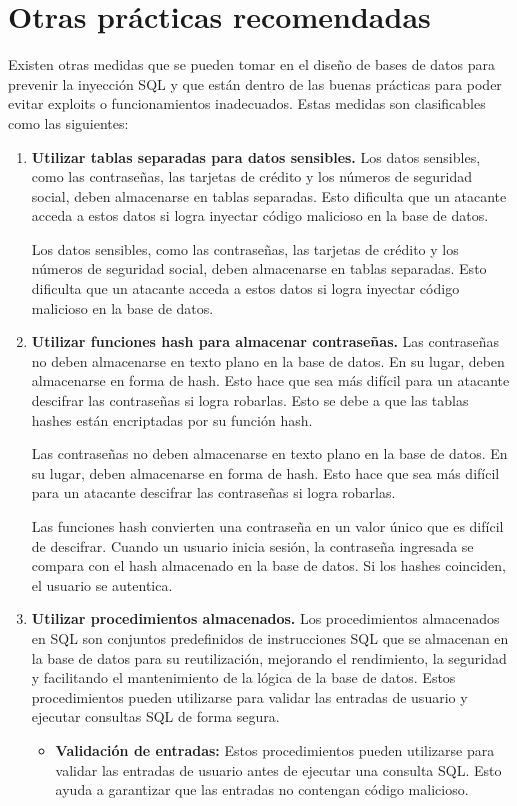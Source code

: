 \documentclass[11pt]{report}
\begin{document}
\section{Otras prácticas recomendadas}
Existen otras medidas que se pueden tomar en el diseño de bases de datos para prevenir la inyección SQL y que están dentro de las buenas prácticas para poder 
evitar exploits o funcionamientos inadecuados. Estas medidas son clasificables como las siguientes:
\begin{enumerate}
  \item \textbf{Utilizar tablas separadas para datos sensibles.} Los datos sensibles, como las contraseñas, las tarjetas
  de crédito y los números de seguridad social, deben almacenarse en tablas separadas. Esto dificulta que un atacante 
  acceda a estos datos si logra inyectar código malicioso en la base de datos.

  Los datos sensibles, como las contraseñas, las tarjetas de crédito y los números de seguridad social, deben almacenarse
  en tablas separadas. Esto dificulta que un atacante acceda a estos datos si logra inyectar código malicioso en la base
  de datos.
  
  \item \textbf{Utilizar funciones hash para almacenar contraseñas.} Las contraseñas no deben almacenarse en texto plano en
  la base de datos. En su lugar, deben almacenarse en forma de hash. Esto hace que sea más difícil para un atacante descifrar
  las contraseñas si logra robarlas. Esto se debe a que las tablas hashes están encriptadas por su función hash.

  Las contraseñas no deben almacenarse en texto plano en la base de datos. En su lugar, deben almacenarse en forma de hash.
  Esto hace que sea más difícil para un atacante descifrar las contraseñas si logra robarlas.
  
  Las funciones hash convierten una contraseña en un valor único que es difícil de descifrar. Cuando un usuario inicia sesión,
  la contraseña ingresada se compara con el hash almacenado en la base de datos. Si los hashes coinciden, el usuario se autentica.
  
  \item \textbf{Utilizar procedimientos almacenados.} Los procedimientos almacenados en SQL son conjuntos predefinidos de instrucciones 
  SQL que se almacenan en la base de datos para su reutilización, mejorando el rendimiento, la seguridad y facilitando el mantenimiento 
  de la lógica de la base de datos. Estos procedimientos pueden utilizarse para validar las entradas de usuario y ejecutar consultas SQL
  de forma segura.
  \begin{itemize}
    \item \textbf{Validación de entradas:} Estos procedimientos pueden utilizarse para validar las entradas de usuario antes de ejecutar 
    una consulta SQL. Esto ayuda a garantizar que las entradas no contengan código malicioso.
    

\end{itemize}
\end{enumerate}
\end{document}
